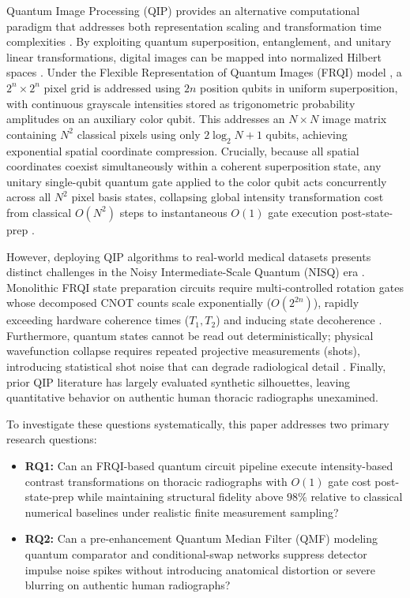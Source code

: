 \documentclass[12pt,onecolumn,draftclsnofoot]{IEEEtran}
\begin{document}
Quantum Image Processing (QIP) provides an alternative computational paradigm that addresses both representation scaling and transformation time complexities \cite{venegas2012quantum, yan2017survey}. By exploiting quantum superposition, entanglement, and unitary linear transformations, digital images can be mapped into normalized Hilbert spaces \cite{le2011flexible, zhang2013neqr}. Under the Flexible Representation of Quantum Images (FRQI) model \cite{le2011flexible}, a $2^n \times 2^n$ pixel grid is addressed using $2n$ position qubits in uniform superposition, with continuous grayscale intensities stored as trigonometric probability amplitudes on an auxiliary color qubit. This addresses an $N \times N$ image matrix containing $N^2$ classical pixels using only $2\log_2 N + 1$ qubits, achieving exponential spatial coordinate compression. Crucially, because all spatial coordinates coexist simultaneously within a coherent superposition state, any unitary single-qubit quantum gate applied to the color qubit acts concurrently across all $N^2$ pixel basis states, collapsing global intensity transformation cost from classical $O(N^2)$ steps to instantaneous $O(1)$ gate execution post-state-prep \cite{le2011flexible, wang2020quantum}.

However, deploying QIP algorithms to real-world medical datasets presents distinct challenges in the Noisy Intermediate-Scale Quantum (NISQ) era \cite{preskill2018quantum}. Monolithic FRQI state preparation circuits require multi-controlled rotation gates whose decomposed CNOT counts scale exponentially ($O(2^{2n})$), rapidly exceeding hardware coherence times ($T_1, T_2$) and inducing state decoherence \cite{cross2019validating}. Furthermore, quantum states cannot be read out deterministically; physical wavefunction collapse requires repeated projective measurements (shots), introducing statistical shot noise that can degrade radiological detail \cite{bravyi2021error}. Finally, prior QIP literature has largely evaluated synthetic silhouettes, leaving quantitative behavior on authentic human thoracic radiographs unexamined.

To investigate these questions systematically, this paper addresses two primary research questions:
\begin{itemize}
    \item \textbf{RQ1:} Can an FRQI-based quantum circuit pipeline execute intensity-based contrast transformations on thoracic radiographs with $O(1)$ gate cost post-state-prep while maintaining structural fidelity above $98\%$ relative to classical numerical baselines under realistic finite measurement sampling?
    \item \textbf{RQ2:} Can a pre-enhancement Quantum Median Filter (QMF) modeling quantum comparator and conditional-swap networks suppress detector impulse noise spikes without introducing anatomical distortion or severe blurring on authentic human radiographs?
\end{itemize}
\end{document}

